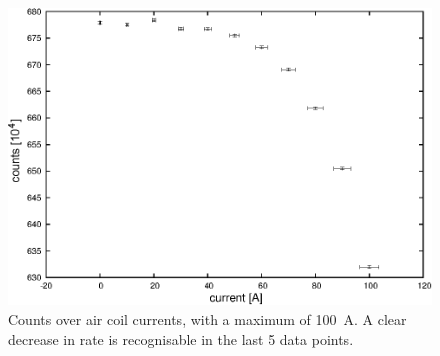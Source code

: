   \begin{figure}

  \centering
  	\includegraphics[width = 0.9 \textwidth]{graphics/aircoilCounts/aircoilsCountsCurrent.eps}
  	\caption[Rate dependance on magnetic fields]{Counts over air coil currents, with a maximum of \SI{100}{\ampere}. A clear decrease in rate is recognisable in the last 5 data points.}
  	\label{fig:aircoilCountsCurrent}
  \end{figure}
  

